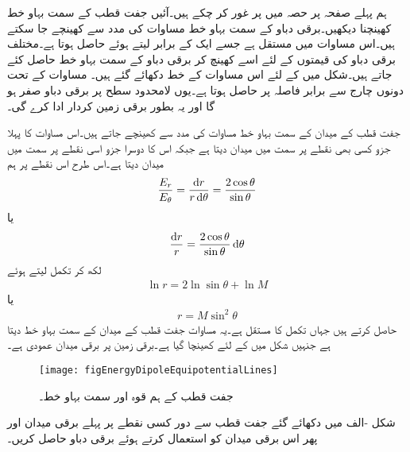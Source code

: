 ہم پہلے صفحہ  پر حصہ  میں  پر غور کر  چکے ہیں۔آئیں جفت قطب کے سمت بہاو خط کھینچنا دیکھیں۔برقی دباو کے سمت بہاو خط مساوات  کی مدد سے کھینچے جا سکتے ہیں۔اس مساوات میں  مستقل ہے جسے ایک کے برابر لیتے ہوئے   حاصل ہوتا ہے۔مختلف برقی دباو کی قیمتوں کے لئے اسے کھینچ کر برقی دباو کے سمت بہاو خط حاصل کئے جاتے ہیں۔شکل  میں  کے لئے اس مساوات کے خط دکھائے گئے ہیں۔ مساوات  کے تحت دونوں چارج سے برابر فاصلہ پر  حاصل ہوتا ہے۔یوں  لامحدود سطح پر برقی دباو صفر ہو گا اور یہ بطور برقی زمین کردار ادا کرے گی۔ 

جفت قطب کے میدان کے سمت بہاو خط مساوات  کی مدد سے کھینچے جاتے ہیں۔اس مساوات کا پہلا جزو کسی بھی نقطے پر  سمت میں میدان  دیتا ہے جبکہ اس کا دوسرا جزو اسی نقطے پر  سمت میں میدان  دیتا ہے۔اس طرح اس نقطے پر ہم
\begin{align*}
\frac{E_r}{E_\theta}=\frac{\dif r}{r \dif \theta} =\frac{2 \cos \theta}{\sin \theta}
\end{align*}
یا
\begin{align*}
\frac{\dif r}{r } =\frac{2 \cos \theta}{\sin \theta}\dif \theta
\end{align*}
لکھ کر تکمل لیتے ہوئے
\begin{align*}
\ln r =2 \ln \sin \theta +\ln M
\end{align*}
یا
\begin{align}
r=M \sin^2 \theta
\end{align}
حاصل کرتے ہیں جہاں  تکمل کا مستقل ہے۔یہ مساوات جفت قطب کے میدان کے سمت بہاو خط دیتا ہے جنہیں شکل  میں  کے لئے کھینچا گیا ہے۔برقی زمین پر برقی میدان عمودی ہے۔
\begin{figure}
\centering
\texttt{[image: figEnergyDipoleEquipotentialLines]}
\caption{جفت قطب کے ہم قوہ اور سمت بہاو خط۔}
\label{شکل_توانائی_جفت_قطب_ہم_قوہ_اور_سمت_بہاو_خط}
\end{figure}

شکل -الف میں دکھائے گئے جفت قطب سے دور کسی نقطے  پر پہلے برقی میدان اور پھر اس برقی میدان کو استعمال کرتے ہوئے برقی دباو حاصل کریں۔


